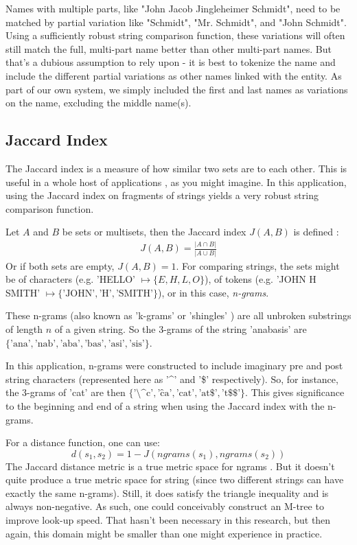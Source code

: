 \documentclass[11pt]{article}
\begin{document}
Names with multiple parts, like "John Jacob Jingleheimer Schmidt", need to be matched by
partial variation like "Schmidt", "Mr. Schmidt", and "John Schmidt". 
Using a sufficiently robust string comparison function, these variations will often 
still match the full, multi-part name better than other multi-part names.
But that's a dubious assumption to rely upon - it is best to tokenize the name and
include the different partial variations as other names linked with the entity.
As part of our own system, we simply included the first and last names as variations on
the name, excluding the middle name(s).

\subsection{Jaccard Index}
The Jaccard index is a measure of how similar two sets are to each other.
This is useful in a whole host of applications \cite{general}, as you might imagine. 
In this application, using the Jaccard index on fragments of strings yields a very
robust string comparison function.

Let $A$ and $B$ be sets or multisets, then the Jaccard index $J(A,B)$ is defined \cite{mining, comparison}:
\begin{align*}
    J(A, B) = \frac{\left| A \cap B \right|}{\left| A \cup B \right|}
\end{align*}
Or if both sets are empty, $J(A,B) = 1$.
For comparing strings, the sets might be of characters (e.g. 'HELLO' $\mapsto \{E, H, L, O\}$), 
of tokens (e.g. 'JOHN H SMITH' $\mapsto \{\text{'JOHN'}, \text{'H'}, \text{'SMITH'}\}$),
or in this case, {\em n-grams}.

These n-grams (also known as 'k-grams' or 'shingles' \cite{mining}) are all unbroken substrings of 
length $n$ of a given string. So the 3-grams of the string 'anabasis' are 
$\{\text{'ana'}, \text{'nab'}, \text{'aba'}, \text{'bas'}, \text{'asi'}, \text{'sis'}\}$. 

In this application, n-grams were constructed to include imaginary pre and post string characters
(represented here as '\^{}' and '\$' respectively). So, for instance, the 3-grams of 'cat' are then
$\{\text{'\^{}\^{}c'}, \text{'\^{}ca'}, \text{'cat'}, \text{'at\$'}, \text{'t\$\$'}\}$. This gives
significance to the beginning and end of a string when using the Jaccard index with the n-grams.

For a distance function, one can use:
\[d(s_1,s_2) = 1-J(ngrams(s_1),ngrams(s_2))\]
The Jaccard distance metric is a true metric space for ngrams \cite{data_mining}.
But it doesn't quite produce a true metric space for string
(since two different strings can have exactly the same n-grams). Still, it does satisfy
the triangle inequality \cite{general} and is always non-negative. As such, one could
conceivably construct an M-tree \cite{mtree} to improve look-up speed. 
That hasn't been necessary in this research, but then again, this domain might be smaller
than one might experience in practice.
\end{document}
